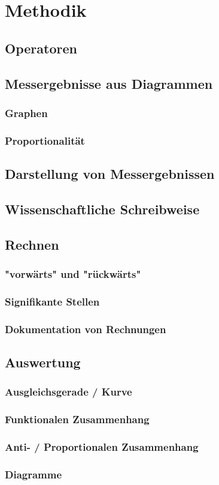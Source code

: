 \chapter{Methodik}

\section{Operatoren}

\section{Messergebnisse aus Diagrammen}

\subsection{Graphen}

\subsection{Proportionalität}


\section{Darstellung von Messergebnissen}

\section{Wissenschaftliche Schreibweise}

\section{Rechnen}

\subsection{"vorwärts" und "rückwärts"}

\subsection{Signifikante Stellen}

\subsection{Dokumentation von Rechnungen}

\section{Auswertung}

\subsection{Ausgleichsgerade / Kurve}

\subsection{Funktionalen Zusammenhang}

\subsection{Anti- / Proportionalen Zusammenhang}

\subsection{Diagramme}
